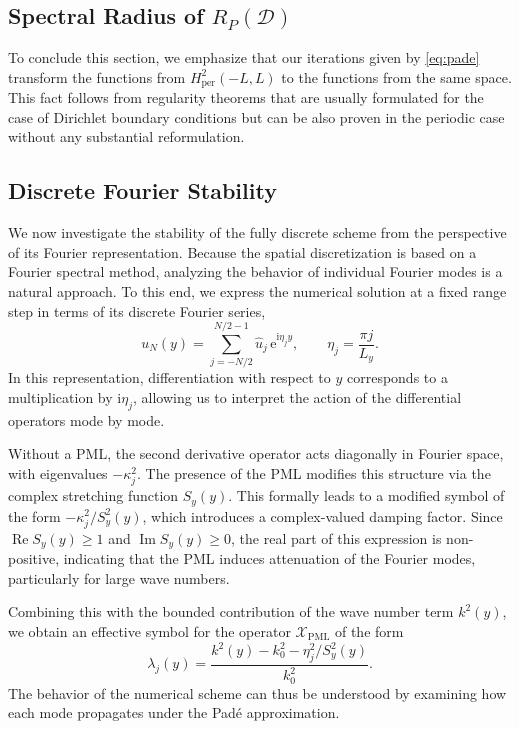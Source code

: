 \documentclass[11pt,a4paper]{article}
\newcommand{\iu}{\mathrm{i}} %
\newcommand{\cD}{\mathcal{D}}
\newcommand{\cX}{\mathcal{X}}
\DeclareMathOperator{\Real}{Re}
\DeclareMathOperator{\Imag}{Im}
\theoremstyle{plain}%
\theoremstyle{definition}
\theoremstyle{remark}
\begin{document}
\subsection{Spectral Radius of $R_P(\cD)$}
To conclude this section, we emphasize that our iterations given by \eqref{eq:pade} transform the functions from $H^2_{\mathrm{per}}(-L,L)$ to the functions from the same space. 
This fact follows from regularity theorems \cite{evans2022} that are usually formulated for the case of Dirichlet boundary conditions but can be also proven in the periodic case without any substantial reformulation. 


\subsection{Discrete Fourier Stability}
We now investigate the stability of the fully discrete scheme from the perspective of its Fourier representation.
Because the spatial discretization is based on a Fourier spectral method, analyzing the behavior of individual Fourier modes is a natural approach.
%
To this end, we express the numerical solution at a fixed range step in terms of its discrete Fourier series,
\begin{equation*}
     u_N(y) = \sum_{j=-N/2}^{N/2-1} \hat{u}_j\, \mathrm{e}^{\iu \eta_j y}, 
\qquad \eta_j = \frac{\pi j}{L_y}.
\end{equation*}
In this representation, differentiation with respect to $y$ corresponds to a multiplication by $\iu\eta_j$, 
allowing us to interpret the action of the differential operators mode by mode.

Without a PML, the second derivative operator acts diagonally in Fourier space, with eigenvalues $-\kappa_j^2$. 
The presence of the PML modifies this structure via the complex stretching function $S_y(y)$. 
This formally leads to a modified symbol of the form
$-\kappa_j^2/S_y^2(y)$,
which introduces a complex-valued damping factor. 
Since $\Real S_y(y) \ge 1$ and $\Imag S_y(y) \ge 0$, the real part of this expression is non-positive, 
indicating that the PML induces attenuation of the Fourier modes, particularly for large wave numbers.

Combining this with the bounded contribution of the wave number term $k^2(y)$, 
we obtain an effective symbol for the operator $\cX_{\mathrm{PML}}$ of the form
\begin{equation*}
     \lambda_j(y) = \frac{k^2(y) - k_0^2 - \eta_j^2 / S_y^2(y)}{k_0^2}.
\end{equation*}
The behavior of the numerical scheme can thus be understood by examining how each mode propagates under the Pad\'e approximation.
\end{document}
